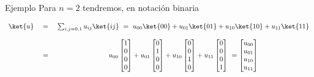 \documentclass[a4paper,11pt]{book} %
\numberwithin{equation}{chapter}
\begin{document}
	\begin{mybox_green}{Ejemplo}
	Para $n=2$ tendremos, en notación binaria  

	\begin{equation*}
		\begin{array}{ccc}
	\ket{u} ~&=& ~ \sum_{i,j=0,1} u_{ij} \ket{ij}~=~ u_{00}\ket{00}+ u_{01}\ket{01} + u_{10}\ket{10} +u_{11}\ket{11}
	\\ \\
	~&=&~ u_{00}\begin{bmatrix}1\\0\\0 \\ 0\end{bmatrix}+ u_{01}  \begin{bmatrix}0\\1\\0 \\ 0\end{bmatrix} + u_{10}
	\begin{bmatrix}0\\0\\1\\0\end{bmatrix}+u_{11}  \begin{bmatrix}0\\0\\0\\1\end{bmatrix}   ~ = 
	\begin{bmatrix}u_{00}\\ u_{01}\\ u_{10} \\ u_{11}  \end{bmatrix}
	\end{array}
	\end{equation*}


\end{mybox_green}
\end{document}

